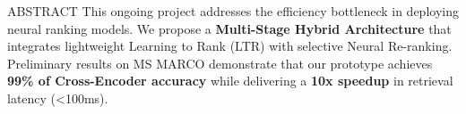 \documentclass[10pt]{article}
\begin{document}
\vspace{-0.2cm}
\begin{center}
\begin{minipage}{0.96\paperwidth}
    \begin{contentbox}{ABSTRACT}
        \small
        This ongoing project addresses the efficiency bottleneck in deploying neural ranking models. We propose a \textbf{Multi-Stage Hybrid Architecture} that integrates lightweight Learning to Rank (LTR) with selective Neural Re-ranking. Preliminary results on MS MARCO demonstrate that our prototype achieves \textbf{99\% of Cross-Encoder accuracy} while delivering a \textbf{10x speedup} in retrieval latency (<100ms).
    \end{contentbox}
\end{minipage}
\end{center}
\vspace{-0.3cm}
\end{document}
